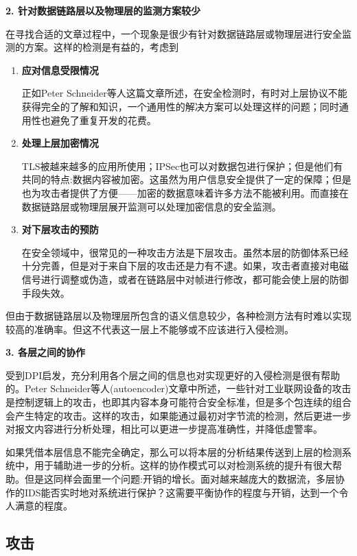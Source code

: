 \documentclass[12pt]{article} %
\begin{document}
\textbf{2. 针对数据链路层以及物理层的监测方案较少}

在寻找合适的文章过程中，一个现象是很少有针对数据链路层或物理层进行安全监测的方案。这样的检测是有益的，考虑到

\begin{enumerate}
    \item \textbf{应对信息受限情况}

    正如Peter Schneider等人这篇文章所述，在安全检测时，有时对上层协议不能获得完全的了解和知识，一个通用性的解决方案可以处理这样的问题；同时通用性也避免了重复开发的花费。

    \item \textbf{处理上层加密情况}

    TLS被越来越多的应用所使用；IPSec也可以对数据包进行保护；但是他们有共同的特点:数据内容被加密。这虽然为用户信息安全提供了一定的保障；但是也为攻击者提供了方便——加密的数据意味着许多方法不能被利用。而直接在数据链路层或物理层展开监测可以处理加密信息的安全监测。

    \item \textbf{对下层攻击的预防}

    在安全领域中，很常见的一种攻击方法是下层攻击。虽然本层的防御体系已经十分完善，但是对于来自下层的攻击还是力有不逮。如果，攻击者直接对电磁信号进行调整或伪造，或者在链路层中对帧进行修改，都可能会使上层的防御手段失效。
\end{enumerate}

但由于数据链路层以及物理层所包含的语义信息较少，各种检测方法有时难以实现较高的准确率。但这不代表这一层上不能够或不应该进行入侵检测。

\textbf{3. 各层之间的协作}

受到DPI启发，充分利用各个层之间的信息也对实现更好的入侵检测是很有帮助的。Peter Schneider等人(autoencoder)文章中所述，一些针对工业联网设备的攻击是控制逻辑上的攻击，也即其内容本身可能符合安全标准，但是多个包连续的组合会产生特定的攻击。这样的攻击，如果能通过最初对字节流的检测，然后更进一步对报文内容进行分析处理，相比可以更进一步提高准确性，并降低虚警率。

如果凭借本层信息不能完全确定，那么可以将本层的分析结果传送到上层的检测系统中，用于辅助进一步的分析。这样的协作模式可以对检测系统的提升有很大帮助。但是这同样会面里一个问题:开销的增长。面对越来越庞大的数据流，多层协作的IDS能否实时地对系统进行保护？这需要平衡协作的程度与开销，达到一个令人满意的程度。

\subsection{攻击}
\label{attack}
\end{document}
